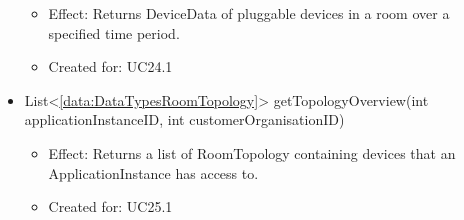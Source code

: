 \begin{description}
\begin{itemize}[noitemsep,nolistsep,leftmargin=-.25cm]
        \begin{itemize}[noitemsep,nolistsep]
           \item Effect: Returns DeviceData of pluggable devices in a room over a specified time period.
\item Created for: UC24.1
        \end{itemize}
      \item \textsf{List\textless{}\ref{data:DataTypesRoomTopology}\textgreater{} getTopologyOverview(int applicationInstanceID, int customerOrganisationID)}
        \begin{itemize}[noitemsep,nolistsep]
           \item Effect: Returns a list of RoomTopology containing devices that an ApplicationInstance has access to.
\item Created for: UC25.1
        \end{itemize}
    \end{itemize}
    \end{description}

